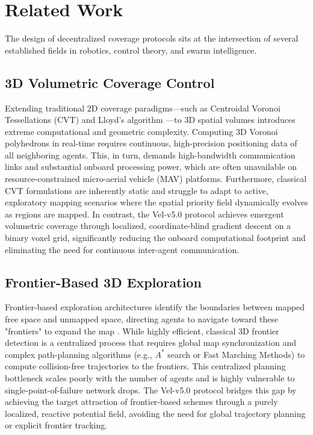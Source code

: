 \documentclass[letterpaper, 10pt, conference]{IEEEtran}
\begin{document}
\section{Related Work}
\label{sec:related}

The design of decentralized coverage protocols sits at the intersection of several established fields in robotics, control theory, and swarm intelligence.

\subsection{3D Volumetric Coverage Control}
Extending traditional 2D coverage paradigms—such as Centroidal Voronoi Tessellations (CVT) and Lloyd's algorithm \cite{lloyd1982, cortes2004}—to 3D spatial volumes introduces extreme computational and geometric complexity. Computing 3D Voronoi polyhedrons in real-time requires continuous, high-precision positioning data of all neighboring agents. This, in turn, demands high-bandwidth communication links and substantial onboard processing power, which are often unavailable on resource-constrained micro-aerial vehicle (MAV) platforms. Furthermore, classical CVT formulations are inherently static and struggle to adapt to active, exploratory mapping scenarios where the spatial priority field dynamically evolves as regions are mapped. In contrast, the Vel-v5.0 protocol achieves emergent volumetric coverage through localized, coordinate-blind gradient descent on a binary voxel grid, significantly reducing the onboard computational footprint and eliminating the need for continuous inter-agent communication.

\subsection{Frontier-Based 3D Exploration}
Frontier-based exploration architectures identify the boundaries between mapped free space and unmapped space, directing agents to navigate toward these "frontiers" to expand the map \cite{yamauchi1997}. While highly efficient, classical 3D frontier detection is a centralized process that requires global map synchronization and complex path-planning algorithms (e.g., $A^*$ search or Fast Marching Methods) to compute collision-free trajectories to the frontiers. This centralized planning bottleneck scales poorly with the number of agents and is highly vulnerable to single-point-of-failure network drops. The Vel-v5.0 protocol bridges this gap by achieving the target attraction of frontier-based schemes through a purely localized, reactive potential field, avoiding the need for global trajectory planning or explicit frontier tracking.
\end{document}
